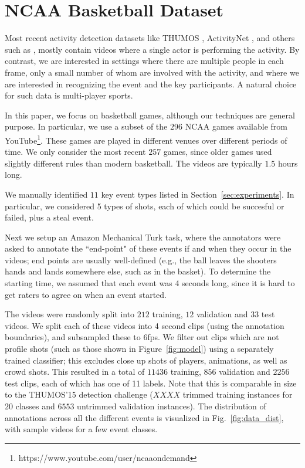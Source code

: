 
\section{NCAA Basketball Dataset}
\label{sec:data}

Most recent activity detection datasets like THUMOS \cite{THUMOS},
ActivityNet \cite{ActivityNet}, and others such as
\cite{UCF101,Finegrained_cooking}, mostly contain videos where a single actor is performing the activity.
By contrast, we are interested in settings where there are multiple
people in each frame, only a small number of whom are involved with
the  activity, and where we are interested in recognizing the event
and the key participants.
A natural choice for such data is multi-player sports.

In this paper, we focus on basketball games, although our techniques
are general purpose.
In particular,  we use a subset of the $296$ NCAA games available from 
YouTube\footnote{https://www.youtube.com/user/ncaaondemand}.  These games are
played in different venues over different periods of time.
We only consider the most recent $257$ games, since older games used
slightly different rules than modern basketball.
The videos are typically $1.5$ hours long.


We manually identified $11$ key event types
listed in Section~\ref{sec:experiments}.
In particular, we considered 
5 types of shots, each of which could be succesful or failed,
plus a steal event. 

Next we setup an Amazon Mechanical Turk task, where the
annotators were asked to annotate the ``end-point" of these events if and when
they occur in the videos; end points are usually well-defined (e.g.,
the ball leaves the shooters hands and lands somewhere else, such as
in the basket).
To determine the starting time, we assumed that each event was 4
seconds long, since it is hard to get raters to agree on when an event
started. 


The videos were randomly split into $212$ training, $12$ validation and $33$
test videos. 
We split each of these videos into 4 second clips (using the
annotation boundaries), and subsampled these to 6fps.
We filter out clips which are not profile shots (such as those shown in
Figure~\ref{fig:model}) using a separately trained classifier; this excludes close up shots of players, animations, as
well as crowd shots.
This resulted in a total of $11436$ training, $856$ validation
and $2256$ test clips, each of which has one of 11 labels.
Note that this is comparable in size to the THUMOS'15 detection
challenge ($XXXX$ trimmed training instances for $20$ classes and $6553$
untrimmed validation instances). The distribution of annotations across all the
different events is visualized in Fig.~\ref{fig:data_dist}, with sample videos
for a few event classes. 

